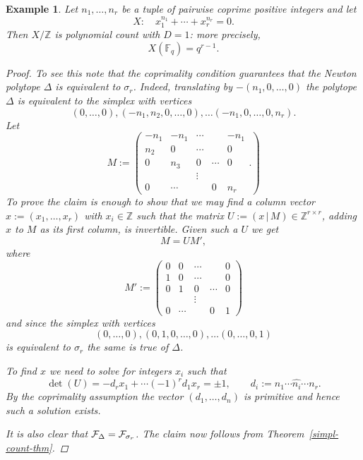 \documentclass[12pt]{article}
\newcommand{\calF}{{\cal F}}
\newcommand{\Z}{{\mathbb Z}}
\newcommand{\F}{{\mathbb F}}
\newtheorem{example}[theorem]{Example}
\begin{document}
\begin{example}
Let $n_1,\ldots,n_r$ be a tuple of pairwise coprime positive integers 
and let
$$
X:\quad x_1^{n_1}+\cdots + x_r^{n_r}=0.
$$
Then $X/\Z$ is polynomial count with $D=1$: more precisely,
\begin{equation}
\label{diag-count}
X(\F_q)=q^{r-1}.
\end{equation}
\begin{proof}
To see this note that the coprimality condition guarantees that the
Newton polytope $\Delta$ is equivalent to $\sigma_r$. Indeed,
translating by $-(n_1,0,\ldots,0)$ the polytope $\Delta$ is equivalent
to the simplex with vertices
$$
(0,\ldots,0),(-n_1,n_2,0,\ldots,0),\ldots (-n_1,0,\ldots,0,n_r).
$$
Let
$$
M:=\left(
\begin{array}{ccccc}
-n_1&-n_1&\cdots&&-n_1\\
n_2&0&\cdots&&0\\
0&n_3&0&\cdots&0\\
&&\vdots&&\\
0&\cdots&&0&n_r
\end{array}.
\right)
$$
To prove the claim is enough to show that we may find a column vector
$x:=(x_1,\ldots,x_r)$ with $x_i\in \Z$ such that the matrix
$U:=\left(x\,|\,M\right)\in \Z^{r\times r}$, adding $x$ to $M$ as its
first column, is invertible. Given such a $U$ we get
$$
M=UM',
$$
where
$$
M':=\left(
\begin{array}{ccccc}
0&0&\cdots&&0\\
1&0&\cdots&&0\\
0&1&0&\cdots&0\\
&&\vdots&&\\
0&\cdots&&0&1
\end{array}
\right)
$$
and since the simplex with vertices
$$
(0,\ldots,0),(0,1,0,\ldots,0),\ldots (0,\ldots,0,1)
$$
is equivalent to $\sigma_r$ the same is true of $\Delta$.

To find $x$ we need to solve for integers $x_i$ such that
$$
\det(U)=-d_rx_1+\cdots (-1)^rd_1x_r=\pm 1,\qquad d_i:=n_1\cdots \widehat{n_i}\cdots n_r.
$$
By the coprimality assumption the vector $(d_1,\ldots,d_n)$ is
primitive and hence such a solution exists.

It is also clear that $\calF_\Delta=\calF_{\sigma_r}$. The claim now follows
from Theorem~\ref{simpl-count-thm}.
\end{proof}
\end{example}
\end{document}
